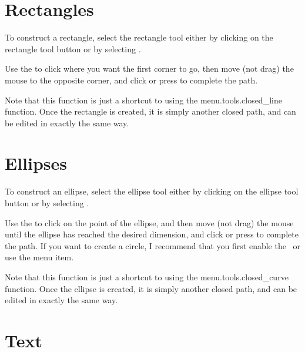 \section{Rectangles}\label{sec:rectangles}


To construct a rectangle, select the rectangle tool either by
clicking on the rectangle tool button or by selecting
.

Use the  to click where
you want the first corner to go, then move (not drag) the mouse to
the opposite corner, and \gls{click} or press
 to complete the \gls{path}.

Note that this function is just a shortcut to using the
\gls{menu.tools.closed_line} function. Once the rectangle is
created, it is simply another closed \gls{path}, and can be edited in
exactly the same way.



\section{Ellipses}\label{sec:ellipses}


To construct an ellipse, select the ellipse tool either by clicking
on the ellipse tool button or by selecting
.

Use the  to click on the
 point of the ellipse, and then move (not drag) the mouse
until the ellipse has reached the desired dimension, and \gls{click}
or press  to complete the \gls{path}. If you want
to create a circle, I recommend that you first enable the \gridlock\ or use the
 menu item.

Note that this function is just a shortcut to using the
\gls{menu.tools.closed_curve} function. Once the ellipse is
created, it is simply another closed \gls{path}, and can be edited in
exactly the same way.


\section{Text}\label{sec:newtext}

